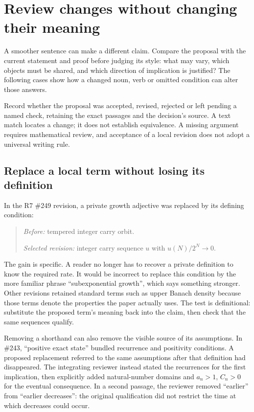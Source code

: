 \section{Review changes without changing their meaning}\label{sec:review}

A smoother sentence can make a different claim. Compare the proposal with
the current statement and proof before judging its style: what may vary,
which objects must be shared, and which direction of implication is justified?
The following cases show how a changed noun, verb or omitted condition can
alter those answers.

Record whether the proposal was accepted, revised, rejected or left pending
a named check, retaining the exact passages and the decision's source. A
text match locates a change; it does not establish equivalence. A missing
argument requires mathematical review, and acceptance of a local revision
does not adopt a universal writing rule.

\subsection{Replace a local term without losing its definition}

In the R7 \#249 revision, a private growth adjective was replaced by its
defining condition:
\begin{quote}
\emph{Before:} tempered integer carry orbit.\par
\emph{Selected revision:} integer carry sequence $u$ with
$u(N)/2^N\to0$.
\end{quote}
The gain is specific. A reader no longer has to recover a private definition
to know the required rate. It would be incorrect to replace this condition by
the more familiar phrase ``subexponential growth'', which says something
stronger. Other revisions retained standard terms such as upper Banach
density because those terms denote the properties the paper actually uses.
The test is definitional: substitute the proposed term's meaning back into
the claim, then check that the same sequences qualify.

Removing a shorthand can also remove the visible source of its assumptions.
In \#243, ``positive exact state'' bundled recurrence and positivity
conditions. A proposed replacement referred to the same assumptions after
that definition had disappeared. The integrating reviewer instead stated the
recurrences for the first implication, then explicitly added natural-number
domains and $a_n>1$, $C_n>0$ for the eventual consequence. In a second passage,
the reviewer removed ``earlier'' from ``earlier decreases'': the original
qualification did not restrict the time at which decreases could occur.

